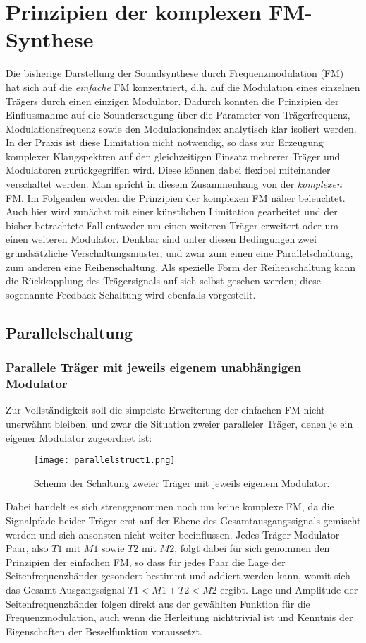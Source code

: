 \section{Prinzipien der komplexen FM-Synthese}
\label{PrinzipKomplexFM}

Die bisherige Darstellung der Soundsynthese durch Frequenzmodulation (FM) hat sich auf die \textit{einfache} FM konzentriert, d.h. auf die Modulation eines einzelnen Trägers durch einen einzigen Modulator. Dadurch konnten die Prinzipien der Einflussnahme auf die Sounderzeugung über die Parameter von Trägerfrequenz, Modulationsfrequenz sowie den Modulationsindex analytisch klar isoliert werden. In der Praxis ist diese Limitation nicht notwendig, so dass zur Erzeugung komplexer Klangspektren auf den gleichzeitigen Einsatz mehrerer Träger und Modulatoren zurückgegriffen wird. Diese können dabei flexibel miteinander verschaltet werden. Man spricht in diesem Zusammenhang von der \textit{komplexen} FM. Im Folgenden werden die Prinzipien der komplexen FM näher beleuchtet. Auch hier wird zunächst mit einer künstlichen Limitation gearbeitet und der bisher betrachtete Fall entweder um einen weiteren Träger erweitert oder um einen weiteren Modulator. Denkbar sind unter diesen Bedingungen zwei grundsätzliche Verschaltungsmuster, und zwar zum einen eine Parallelschaltung, zum anderen eine Reihenschaltung. Als spezielle Form der Reihenschaltung kann die Rückkopplung des Trägersignals auf sich selbst gesehen werden; diese sogenannte Feedback-Schaltung wird ebenfalls vorgestellt. 

\subsection{Parallelschaltung}

\subsubsection{Parallele Träger mit jeweils eigenem unabhängigen Modulator}

Zur Vollständigkeit soll die simpelste Erweiterung der einfachen FM nicht unerwähnt bleiben, und zwar die Situation zweier paralleler Träger, denen je ein eigener Modulator zugeordnet ist:
\FloatBarrier
\begin{figure} [ht]
\centering
  \texttt{[image: parallelstruct1.png]}
\caption{Schema der Schaltung zweier Träger mit jeweils eigenem Modulator. }
\end{figure}
\FloatBarrier 
Dabei handelt es sich strenggenommen noch um keine komplexe FM, da die Signalpfade beider Träger erst auf der Ebene des Gesamtausgangssignals gemischt werden und sich ansonsten nicht weiter beeinflussen. Jedes Träger-Modulator-Paar, also $T1$ mit $M1$ sowie $T2$ mit $M2$, folgt dabei für sich genommen den Prinzipien der einfachen FM, so dass für jedes Paar die Lage der Seitenfrequenzbänder gesondert bestimmt und addiert werden kann, womit sich das Gesamt-Ausgangssignal $T1<M1 + T2<M2$ ergibt. Lage und Amplitude der Seitenfrequenzbänder folgen direkt aus der gewählten Funktion für die Frequenzmodulation, auch wenn die Herleitung nichttrivial ist und Kenntnis der Eigenschaften der Besselfunktion voraussetzt. 

